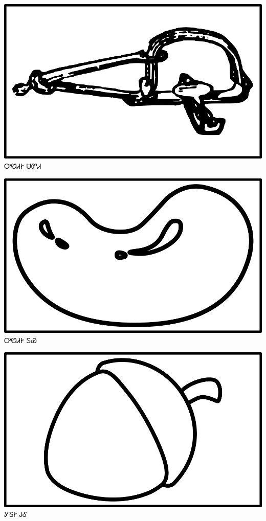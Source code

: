 \documentclass[avery5371]{flashcards}%
\begin{document}
\begin{flashcard}{
\includegraphics[width=0.95\columnwidth,height=.51\columnwidth,keepaspectratio]{../artwork/objects-neutral/sadvdi}
}\Huge ᎤᏬᏗᎨ ᏌᏛᏗ
\end{flashcard}

\begin{flashcard}{
\includegraphics[width=0.95\columnwidth,height=.51\columnwidth,keepaspectratio]{../artwork/objects-neutral/tuya}
}\Huge ᎤᏬᏗᎨ ᏚᏯ
\end{flashcard}

\begin{flashcard}{
\includegraphics[width=0.95\columnwidth,height=.51\columnwidth,keepaspectratio]{../artwork/objects-neutral/gule}
}\Huge ᎩᎦᎨ ᎫᎴ
\end{flashcard}
\end{document}

